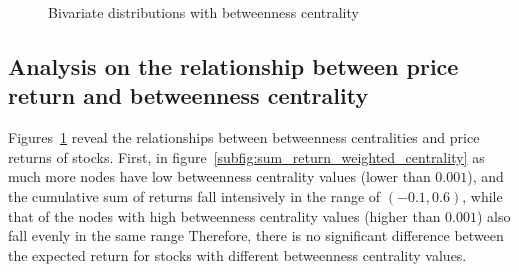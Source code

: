 \begin{figure}
	\hfill%
	\caption{Bivariate distributions with betweenness centrality} \label{fig:bivariate}
\end{figure}

\subsection{Analysis on the relationship between price return and betweenness centrality}
Figures~\ref{fig:bivariate} reveal the relationships between betweenness centralities and price returns of stocks. First, in figure~\ref{subfig:sum_return_weighted_centrality} as much more nodes have low betweenness centrality values (lower than $0.001$), and the cumulative sum of returns fall intensively in the range of $(-0.1, 0.6)$, while that of the nodes with high betweenness centrality values (higher than $0.001$) also fall evenly in the same range Therefore, there is no significant difference between the expected return for stocks with different betweenness centrality values.

